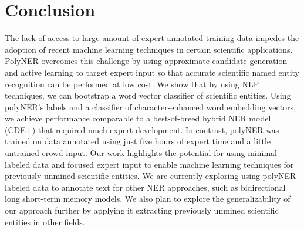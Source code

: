 \section{Conclusion}
\label{sect:apner_conclusion}
The lack of access to large amount of expert-annotated training data impedes the adoption of recent machine learning techniques in certain scientific applications.
PolyNER overcomes this challenge by 
using
approximate candidate generation and active learning to target 
expert input so that accurate scientific named entity recognition can be performed at low cost.
We show that by using NLP techniques, we can bootstrap a word vector classifier of scientific entities.
Using polyNER's labels and a classifier of character-enhanced word embedding vectors, we achieve 
performance comparable to a best-of-breed
hybrid NER model (CDE+) that required much expert development.
In contrast, polyNER was trained on data annotated using just five hours of expert time and a little untrained crowd input.
Our work highlights the potential for using minimal labeled data %
and focused expert input to enable machine learning techniques for previously unmined scientific entities. 
We are currently exploring using polyNER-labeled data to annotate text for other NER approaches,
such as bidirectional long short-term memory models.
We also plan to explore the generalizability of our approach further by applying it extracting previously unmined scientific entities in other fields.
